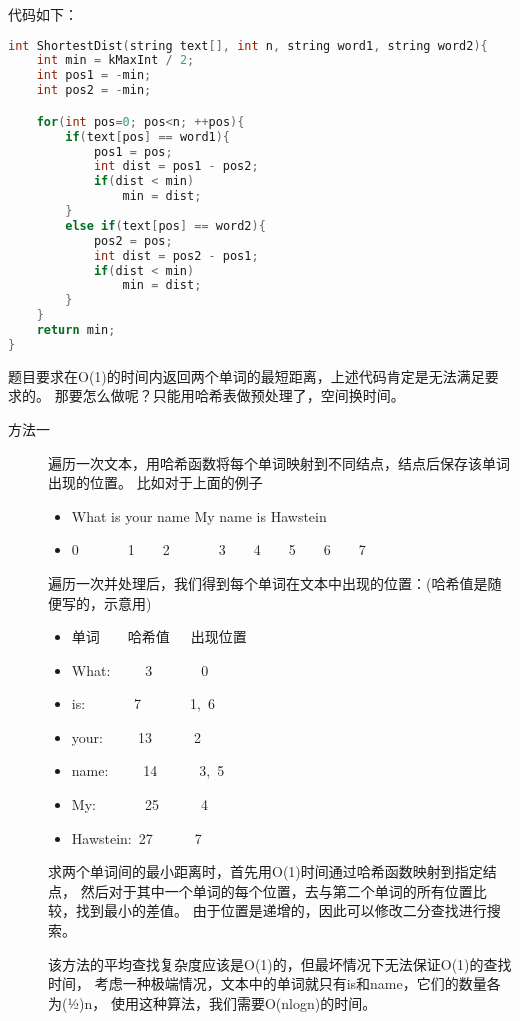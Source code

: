 \begin{description}
代码如下：
\begin{lstlisting}[language=C++]
int ShortestDist(string text[], int n, string word1, string word2){
    int min = kMaxInt / 2;
    int pos1 = -min;
    int pos2 = -min;

    for(int pos=0; pos<n; ++pos){
        if(text[pos] == word1){
            pos1 = pos;
            int dist = pos1 - pos2;
            if(dist < min)
                min = dist;
        }
        else if(text[pos] == word2){
            pos2 = pos;
            int dist = pos2 - pos1;
            if(dist < min)
                min = dist;
        }
    }
    return min;
}
\end{lstlisting}
题目要求在O(1)的时间内返回两个单词的最短距离，上述代码肯定是无法满足要求的。 那要怎么做呢？只能用哈希表做预处理了，空间换时间。
\begin{description}
\item[方法一] 遍历一次文本，用哈希函数将每个单词映射到不同结点，结点后保存该单词出现的位置。 比如对于上面的例子
\begin{itemize}
  \itemsep=-3pt
\item What is your name My name is Hawstein
\item 0\ \ \ \ \ \ \ 1\ \ \ \ 2\ \ \ \ \ \ \ 3\ \ \ \ 4\ \ \ \ 5\ \ \ \ 6\ \ \ \ 7
\end{itemize}
遍历一次并处理后，我们得到每个单词在文本中出现的位置：(哈希值是随便写的，示意用)

\begin{itemize}
  \itemsep=-3pt
\item 单词\ \ \ \ 哈希值\ \ \ 出现位置
\item What:\ \ \ \ \ 3\ \ \ \ \ \ \ 0
\item is:\ \ \ \ \ \ \ 7\ \ \ \ \ \ \ 1,\ 6
\item your:\ \ \ \ \ 13\ \ \ \ \ \ 2
\item name:\ \ \ \ \ 14\ \ \ \ \ \ 3,\ 5
\item My:\ \ \ \ \ \ \ 25\ \ \ \ \ \ 4
\item Hawstein:\ 27\ \ \ \ \ \ 7
\end{itemize}
求两个单词间的最小距离时，首先用O(1)时间通过哈希函数映射到指定结点， 然后对于其中一个单词的每个位置，去与第二个单词的所有位置比较，找到最小的差值。 由于位置是递增的，因此可以修改二分查找进行搜索。

该方法的平均查找复杂度应该是O(1)的，但最坏情况下无法保证O(1)的查找时间， 考虑一种极端情况，文本中的单词就只有is和name，它们的数量各为(½)n， 使用这种算法，我们需要O(nlogn)的时间。


\end{description}
\end{description}
